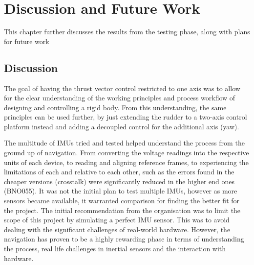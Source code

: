 \chapter{Discussion and Future Work}

This chapter further discusses the results from the testing phase, along with plans for future work

\section{Discussion}

The goal of having the thrust vector control restricted to one axis was to allow for the clear understanding of the working principles and process workflow of designing and controlling a rigid body. 
From this understanding, the same principles can be used further, by just extending the rudder to a two-axis control platform instead and adding a decoupled control for the additional axis (yaw). 

The multitude of IMUs tried and tested helped understand the process from the ground up of navigation. From converting the voltage readings into the respective units of each device, to reading and aligning reference frames, to experiencing the limitations of each and relative to each other, such as the errors found in the cheaper versions (crosstalk) were significantly reduced in the higher end ones (BNO055). It was not the initial plan to test multiple IMUs, however as more sensors became available, it warranted comparison for finding the better fit for the project. 
The initial recommendation from the organisation was to limit the scope of this project by simulating a perfect IMU sensor.
This was to avoid dealing with the significant challenges of real-world hardware. However, the navigation has proven to be a highly rewarding phase in terms of understanding the process, real life challenges in inertial sensors and the interaction with hardware.  
 
